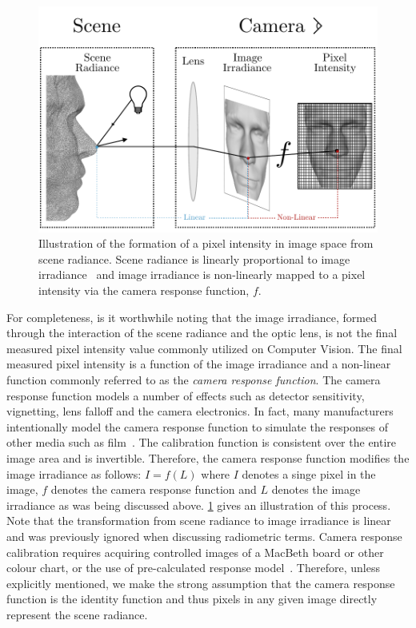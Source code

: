 \begin{figure}[t]
	\centering
	\includegraphics[width=\textwidth]{background/images/scene_radiance_to_pixel}
	\caption{Illustration of the formation of a pixel intensity in image space
	         from scene radiance. Scene radiance is linearly proportional
	         to image irradiance~\cite{horn1979calculating} and image irradiance
	         is non-linearly mapped to a pixel intensity via the camera
	         response function, $f$.}
\label{fig:bg_sfs_scene_to_intensity}
\end{figure}
For completeness, is it worthwhile noting that the image irradiance, formed
through the interaction of the scene radiance and the optic lens, is not
the final measured pixel intensity value commonly utilized on Computer Vision.
The final measured pixel intensity is a function of the image irradiance
and a non-linear function commonly referred to as the
\textit{camera response function}. The camera response function models a number
of effects such as detector sensitivity, vignetting, lens falloff and the
camera electronics. In fact, many manufacturers intentionally model
the camera response function to simulate the responses of other media
such as film~\cite{grossberg2003space}. The calibration function is consistent
over the entire image area and is invertible. Therefore, the camera response
function modifies the image irradiance as follows: $I = f(L)$ where $I$ denotes
a singe pixel in the image, $f$ denotes the camera response function and $L$
denotes the image irradiance as was being discussed above.
\cref{fig:bg_sfs_scene_to_intensity} gives an illustration of this process. Note
that the transformation from scene radiance to image irradiance is
linear~\cite{horn1979calculating} and was previously ignored when discussing
radiometric terms. Camera response calibration requires acquiring controlled
images of a MacBeth board or other colour chart, or the use of pre-calculated
response model~\cite{grossberg2003space}. Therefore, unless explicitly
mentioned, we make the strong assumption that the camera response function
is the identity function and thus pixels in any given image directly
represent the scene radiance.

